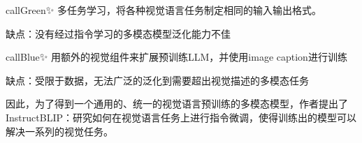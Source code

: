\documentclass[zihao=false,fontset=windows]{ctexart}
\begin{document}
\begin{tcbraster}[raster columns=2,raster equal height=rows,raster column skip=9pt,raster row skip=8pt,raster left skip=0pt,raster right skip=0pt]
\begin{feishuboxnb}{callGreen}{✨}
多任务学习，将各种视觉语言任务制定相同的输入输出格式。\par

缺点：\textcolor{feishuBlue}{没有经过指令学习的多模态模型泛化能力不佳}\par

\end{feishuboxnb}
\begin{feishuboxnb}{callBlue}{✨}
用额外的视觉组件来扩展预训练LLM，并使用image caption进行训练\par

缺点：\textcolor{feishuBlue}{受限于数据，无法广泛的泛化到需要超出视觉描述的多模态任务}\par

\end{feishuboxnb}


\end{tcbraster}


因此，为了得到一个通用的、统一的视觉语言预训练的多模态模型，作者提出了 InstructBLIP：研究如何在视觉语言任务上进行指令微调，使得训练出的模型可以解决一系列的视觉任务。\par
\end{document}
